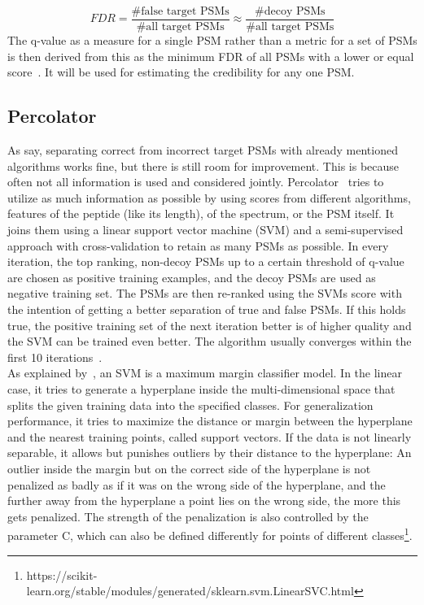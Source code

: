 	\begin{equation}
	FDR = \frac{\text{\# false target PSMs}}{\text{\# all target PSMs}} \approx  \frac{\text{\# decoy PSMs}}{\text{\# all target PSMs}}
	\end{equation}
	The q-value as a measure for a single PSM rather than a metric for a set of PSMs is then derived from this as the minimum FDR of all PSMs with a lower or equal score~\cite{Granholm2012, Aggarwal2016}. It will be used for estimating the credibility for any one PSM.\\
	\subsection{Percolator}
	\label{lab:background:percolator} As \citet{Kll2007} say, separating correct from incorrect target PSMs with already mentioned algorithms works fine, but there is still room for improvement. This is because often not all information is used and considered jointly. Percolator~\cite{Kll2007, Granholm2012} tries to utilize as much information as possible by using scores from different algorithms, features of the peptide (like its length), of the spectrum, or the PSM itself. It joins them using a linear support vector machine (SVM) and a semi-supervised approach with cross-validation to retain as many PSMs as possible. In every iteration, the top ranking, non-decoy PSMs up to a certain threshold of q-value are chosen as positive training examples, and the decoy PSMs are used as negative training set. The PSMs are then re-ranked using the SVMs score with the intention of getting a better separation of true and false PSMs. If this holds true, the positive training set of the next iteration better is of higher quality and the SVM can be trained even better. The algorithm usually converges within the first 10 iterations~\cite{Kll2007}.\\
	As explained by~\citet{Bishop2006}, an SVM is a maximum margin classifier model. In the linear case, it tries to generate a hyperplane inside the multi-dimensional space that splits the given training data into the specified classes. For generalization performance, it tries to maximize the distance or margin between the hyperplane and the nearest training points, called support vectors. If the data is not linearly separable, it allows but punishes outliers by their distance to the hyperplane: An outlier inside the margin but on the correct side of the hyperplane is not penalized as badly as if it was on the wrong side of the hyperplane, and the further away from the hyperplane a point lies on the wrong side, the more this gets penalized. The strength of the penalization is also controlled by the parameter C, which can also be defined differently for points of different classes\footnote{https://scikit-learn.org/stable/modules/generated/sklearn.svm.LinearSVC.html}.\\
